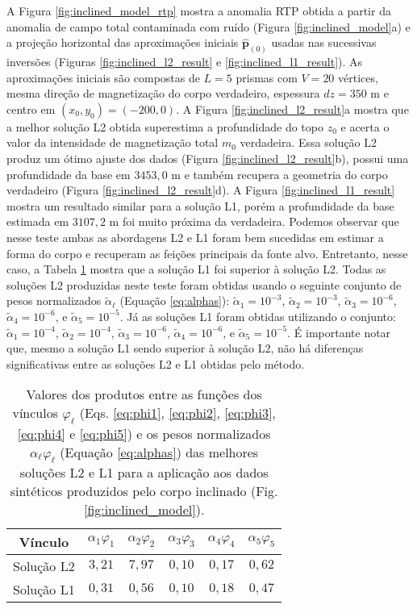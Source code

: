 A Figura \ref{fig:inclined_model_rtp} mostra a anomalia RTP obtida a partir da anomalia de campo total contaminada com ruído (Figura \ref{fig:inclined_model}a) e 
a projeção horizontal das aproximações iniciais $\hat{\mathbf{p}}_{(0)}$ 
usadas nas sucessivas inversões (Figuras \ref{fig:inclined_l2_result} e 
\ref{fig:inclined_l1_result}).
As aproximações iniciais são compostas de $ L= 5$ prismas com $ V = 20 $ vértices, mesma direção de magnetização do corpo verdadeiro, espessura $ dz=350 $ m e centro em $ (x_0, y_0) = (-200, 0) $.
A Figura \ref{fig:inclined_l2_result}a mostra que a melhor solução L2 obtida superestima a profundidade do topo $z_{0}$ e acerta o valor da intensidade de magnetização total $m_{0}$ verdadeira. Essa solução L2 produz um ótimo ajuste dos dados (Figura \ref{fig:inclined_l2_result}b), possui uma profundidade da base em $3453,0$ m e também recupera a geometria do corpo verdadeiro (Figura \ref{fig:inclined_l2_result}d).
A Figura \ref{fig:inclined_l1_result} mostra um resultado similar para a solução L1, porém a profundidade da base estimada em $3107,2$ m foi muito próxima da verdadeira.
Podemos observar que nesse teste ambas as abordagens L2 e L1 foram bem sucedidas em estimar a forma do corpo e recuperam as feições principais da fonte alvo. Entretanto, nesse caso, a Tabela \ref{tab:inc} mostra que a solução L1 foi superior à solução L2.
Todas as soluções L2 produzidas neste teste foram obtidas usando o seguinte conjunto de pesos normalizados $\tilde{\alpha}_{\ell}$ (Equação \ref{eq:alphas}): 
$\tilde{\alpha}_{1} = 10^{-3}$, $\tilde{\alpha}_{2} = 10^{-3}$, 
$\tilde{\alpha}_{3} = 10^{-6}$, $\tilde{\alpha}_{4} = 10^{-6}$, e 
$\tilde{\alpha}_{5} = 10^{-5}$. 
Já as soluções L1 foram obtidas utilizando o conjunto: 
$\tilde{\alpha}_{1} = 10^{-4}$, $\tilde{\alpha}_{2} = 10^{-4}$, 
$\tilde{\alpha}_{3} = 10^{-6}$, $\tilde{\alpha}_{4} = 10^{-6}$, e 
$\tilde{\alpha}_{5} = 10^{-5}$.
É importante notar que, mesmo a solução L1 sendo superior à solução L2, não há diferenças significativas entre as soluções L2 e L1 obtidas pelo método.

\begin{table}[h]\label{tab:inc}
	\caption{Valores dos produtos entre as funções dos vínculos $ \varphi_{\ell} $ (Eqs. \ref{eq:phi1}, \ref{eq:phi2}, \ref{eq:phi3}, \ref{eq:phi4} e \ref{eq:phi5}) e os pesos normalizados $ \alpha_\ell \varphi_\ell  $ (Equação \ref{eq:alphas}) das melhores soluções L2 e L1 para a aplicação aos dados sintéticos produzidos pelo corpo inclinado (Fig. \ref{fig:inclined_model}).}
	\centering
	\vspace{0.5cm}
	\begin{tabular}{c|ccccc}
		Vínculo & $ \alpha_{1}\varphi _1 $ & $ \alpha_{2}\varphi _2 $ &  $ \alpha_{3}\varphi _3 $ &  $ \alpha_{4}\varphi _4 $ &  $ \alpha_{5}\varphi _5 $ \\
		\hline
		Solução L2 & $ 3,21 $ & $ 7,97 $ & $ 0,10 $ & $0,17 $ & $ 0,62 $ \\ 
		Solução L1 & $ 0,31 $ & $ 0,56 $ & $ 0,10 $ & $0,18$ & $ 0,47 $
	\end{tabular}
\end{table}


